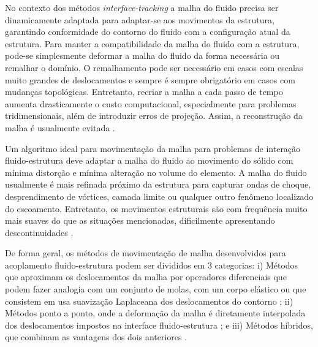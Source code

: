 \documentclass[_ArquivoPrincipal.tex]{subfiles}
\begin{document}


No contexto dos métodos \textit{ interface-tracking} a malha do fluido precisa ser dinamicamente adaptada para adaptar-se aos movimentos da estrutura, garantindo conformidade do contorno do fluido com a configuração atual da estrutura. Para manter a compatibilidade da malha do fluido com a estrutura, pode-se simplesmente deformar a malha do fluido da forma necessária \cite{TezduyarABJM:1993,JohnsonT:1994,FarhatLL:1998,deBoerZB:2007} ou remalhar o domínio. O remalhamento pode ser necessário em casos com escalas muito grandes de deslocamentos e sempre é sempre obrigatório em casos com mudanças topológicas. Entretanto, recriar a malha a cada passo de tempo aumenta drasticamente o custo computacional, especialmente para problemas tridimensionais, além de introduzir erros de projeção. Assim, a reconstrução da malha é usualmente evitada \cite{CoulierD:2016}.

Um algoritmo ideal para movimentação da malha para problemas de interação fluido-estrutura deve adaptar a malha do fluido ao movimento do sólido com mínima distorção e mínima alteração no volume do elemento. A malha do fluido usualmente é mais refinada próximo da estrutura para capturar ondas de choque, desprendimento de vórtices, camada limite ou qualquer outro fenômeno localizado do escoamento. Entretanto, os movimentos estruturais são com frequência muito mais suaves do que as situações mencionadas, dificilmente apresentando descontinuidades \cite{FernandesCS:2018}.

De forma geral, os métodos de movimentação de malha desenvolvidos para acoplamento fluido-estrutura podem ser divididos em 3 categorias: i) Métodos que aproximam os deslocamentos da malha por operadores diferenciais que podem fazer analogia com um conjunto de molas, com um corpo elástico ou que consistem em usa suavização Laplaceana dos deslocamentos do contorno \cite{TezduyarABJM:1993,JohnsonT:1994,SteinTB:1998,BottassoDS:2005,MasudH:1997,KanchiM:2007};
ii) Métodos ponto a ponto, onde a deformação da malha é diretamente interpolada dos deslocamentos impostos na interface fluido-estrutura \cite{doneaALE,MittalT:1991,TezduyarBML:1992,SanchesC:2014,CoulierD:2016};
e iii) Métodos híbridos, que combinam as vantagens dos dois anteriores \cite{MartineauG2004,Bartels:2005,LiuQX:2006,Lefrancois:2008}.
\end{document}

